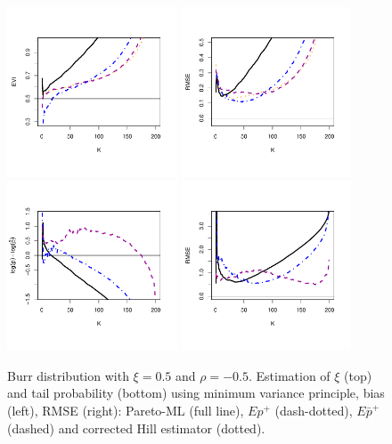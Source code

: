 \documentclass[twoside,leqno,11pt]{article}
\begin{document}
 \begin{figure}[!ht]
  \centering
  \includegraphics[width=0.45\textwidth]{burr05Pareto_evi.pdf} 
\includegraphics[width=0.45\textwidth]{burr05Pareto_rmse.pdf} \\
\includegraphics[width=0.45\textwidth]{burr05Pareto_tail.pdf}
\includegraphics[width=0.45\textwidth]{burr05Pareto_tail_rmse.pdf} 
\caption{Burr distribution with $\xi=0.5$ and $\rho=-0.5$. Estimation of $\xi$ (top) and tail probability (bottom) using minimum variance principle, bias (left), RMSE (right): Pareto-ML (full line), $Ep^+$ (dash-dotted), $E\bar{p}^+$ (dashed) and corrected Hill estimator (dotted).}
  \end{figure}
  
\end{document}

